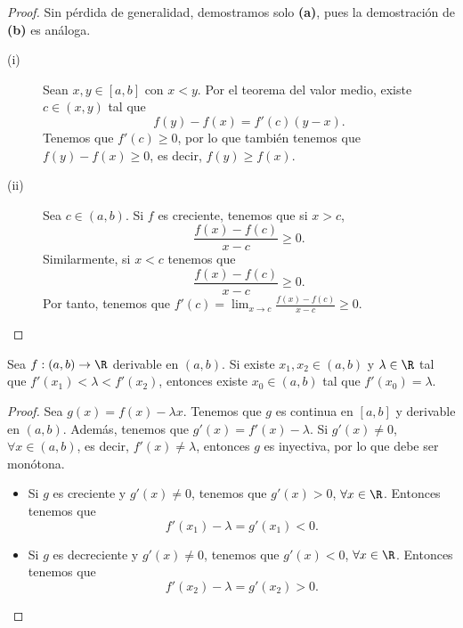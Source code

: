 \begin{proof} Sin pérdida de generalidad, demostramos solo \textbf{(a)}, pues la demostración de \textbf{(b)} es análoga.
\begin{description}
	\item[(i)] Sean $\displaystyle x,y \in [a,b] $ con $\displaystyle x < y $. Por el teorema del valor medio, existe $\displaystyle c \in \left(x,y\right) $ tal que 
		\[ f\left(y\right)-f\left(x\right) = f'\left(c\right)\left(y-x\right) .\]
		Tenemos que $\displaystyle f'\left(c\right) \geq0 $, por lo que también tenemos que $\displaystyle f\left(y\right)-f\left(x\right) \geq 0  $, es decir, $\displaystyle f\left(y\right) \geq f\left(x\right) $.
	\item[(ii)] Sea $\displaystyle c \in \left(a,b\right) $. Si $\displaystyle f $ es creciente, tenemos que si $\displaystyle x > c $, 
		\[ \frac{f\left(x\right)-f\left(c\right)}{x-c} \geq 0 .\]
		Similarmente, si $\displaystyle x < c $ tenemos que 
		\[ \frac{f\left(x\right)-f\left(c\right)}{x-c} \geq 0 .\]
	Por tanto, tenemos que $\displaystyle f'\left(c\right) = \lim_{x \to c}\frac{f\left(x\right)-f\left(c\right)}{x-c} \geq 0 $.
\end{description}
\end{proof}
\begin{ftheorem}[]
\normalfont Sea $\displaystyle f : \left(a,b\right) \to \R $ derivable en $\displaystyle \left(a,b\right) $. Si existe $\displaystyle x_{1}, x_{2} \in \left(a,b\right) $ y $\displaystyle \lambda \in \R $ tal que $\displaystyle f'\left(x_{1}\right) < \lambda < f'\left(x_{2}\right) $, entonces existe $\displaystyle x_{0} \in \left(a,b\right) $ tal que $\displaystyle f'\left(x_{0}\right) = \lambda  $.
\end{ftheorem}
\begin{proof}
	Sea $\displaystyle g\left(x\right) = f\left(x\right)-\lambda x $. Tenemos que $\displaystyle g $ es continua en $\displaystyle [a,b] $ y derivable en $\displaystyle \left(a,b\right) $. Además, tenemos que $\displaystyle g'\left(x\right) = f'\left(x\right) - \lambda  $. Si $\displaystyle g'\left(x\right) \neq 0  $, $\displaystyle \forall x \in \left(a,b\right) $, es decir, $\displaystyle f'\left(x\right) \neq \lambda  $, entonces $\displaystyle g $ es inyectiva, por lo que debe ser monótona.
\begin{itemize}
\item Si $\displaystyle g $ es creciente y $\displaystyle g'\left(x\right) \neq 0 $, tenemos que $\displaystyle g'\left(x\right) > 0 $, $\displaystyle \forall x \in \R $. Entonces tenemos que 
	\[ f'\left(x_{1}\right)-\lambda = g'\left(x_{1}\right) < 0 .\]
\item Si $\displaystyle g $ es decreciente y $\displaystyle g'\left(x\right) \neq 0 $, tenemos que $\displaystyle g'\left(x\right) < 0 $, $\displaystyle \forall x \in \R $. Entonces tenemos que
	\[ f'\left(x_{2}\right) - \lambda = g'\left(x_{2}\right) > 0 .\] 
\end{itemize}
\end{proof}
